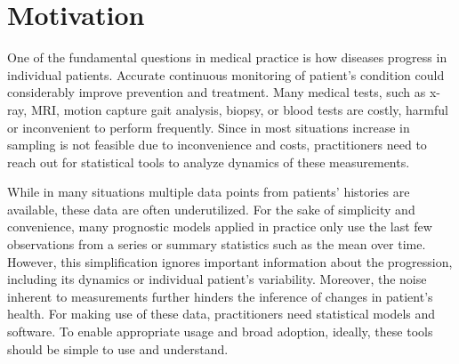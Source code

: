 \documentclass[preprint]{imsart}
\numberwithin{equation}{section}
\theoremstyle{plain}
\begin{document}
\begin{frontmatter}
\begin{abstract}
  
\end{abstract}

\begin{keyword}[class=MSC]
\end{keyword}

\begin{keyword}
\end{keyword}

\end{frontmatter}

\maketitle


\section{Motivation}

One of the fundamental questions in medical practice is how diseases progress in individual patients. Accurate continuous monitoring of patient's condition could considerably improve prevention and treatment. Many medical tests, such as x-ray, MRI, motion capture gait analysis, biopsy, or blood tests are costly, harmful or inconvenient to perform frequently. Since in most situations increase in sampling is not feasible due to inconvenience and costs, practitioners need to reach out for statistical tools to analyze dynamics of these measurements.

While in many situations multiple data points from patients' histories are available, these data are often underutilized. For the sake of simplicity and convenience, many prognostic models applied in practice only use the last few observations from a series or summary statistics such as the mean over time. However, this simplification ignores important information about the progression, including its dynamics or individual patient's variability. Moreover, the noise inherent to measurements further hinders the inference of changes in patient's health. For making use of these data, practitioners need statistical models and software. To enable appropriate usage and broad adoption, ideally, these tools should be simple to use and understand.
\end{document}
